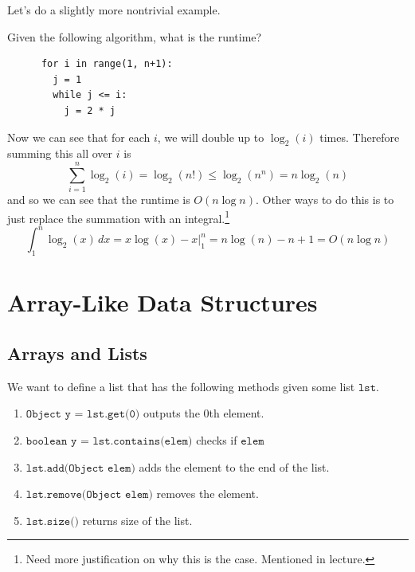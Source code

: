 \documentclass{article}
\begin{document}
  Let's do a slightly more nontrivial example. 

  \begin{example}
    Given the following algorithm, what is the runtime? 
    \begin{lstlisting}
      for i in range(1, n+1): 
        j = 1 
        while j <= i: 
          j = 2 * j
    \end{lstlisting}
    Now we can see that for each $i$, we will double up to $\log_2 (i)$ times. Therefore summing this all over $i$ is 
    \begin{equation}
      \sum_{i = 1}^n \log_2 (i) = \log_2 (n!) \leq \log_2 (n^n) = n \log_2 (n)
    \end{equation}
    and so we can see that the runtime is $O(n \log n)$. Other ways to do this is to just replace the summation with an integral.\footnote{Need more justification on why this is the case. Mentioned in lecture.} 
    \begin{equation}
      \int_1^n \log_2 (x) \,dx = x \log(x) - x \big|_1^n = n \log(n) - n + 1 = O(n \log n)
    \end{equation}
  \end{example}

\section{Array-Like Data Structures} 

  \subsection{Arrays and Lists} 

    We want to define a list that has the following methods given some list $\texttt{lst}$. 
    \begin{enumerate}
      \item $\texttt{Object y = lst.get(0)}$ outputs the $0$th element. 
      \item $\texttt{boolean y = lst.contains(elem)}$ checks if $\texttt{elem}$ 
      \item $\texttt{lst.add(Object elem)}$ adds the element to the end of the list. 
      \item $\texttt{lst.remove(Object elem)}$ removes the element. 
      \item $\texttt{lst.size()}$ returns size of the list. 
    \end{enumerate}
\end{document}
